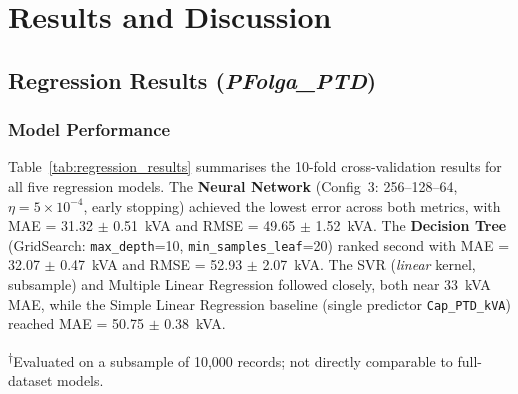 \documentclass[conference]{IEEEtran}
\begin{document}
\section{Results and Discussion}

\subsection{Regression Results (\textit{PFolga\_PTD})}

\subsubsection{Model Performance}

Table~\ref{tab:regression_results} summarises the 10-fold cross-validation results for all five regression models. The \textbf{Neural Network} (Config~3: 256--128--64, $\eta=5{\times}10^{-4}$, early stopping) achieved the lowest error across both metrics, with MAE = 31.32 $\pm$ 0.51~kVA and RMSE = 49.65 $\pm$ 1.52~kVA. The \textbf{Decision Tree} (GridSearch: \texttt{max\_depth}=10, \texttt{min\_samples\_leaf}=20) ranked second with MAE = 32.07 $\pm$ 0.47~kVA and RMSE = 52.93 $\pm$ 2.07~kVA. The SVR (\textit{linear} kernel, subsample) and Multiple Linear Regression followed closely, both near 33~kVA MAE, while the Simple Linear Regression baseline (single predictor \texttt{Cap\_PTD\_kVA}) reached MAE = 50.75 $\pm$ 0.38~kVA.

\begin{table}[htbp]
\centering
\caption{Regression Results -- 10-Fold Cross-Validation}
\small
{}
\vspace{1mm}
\footnotesize{\textsuperscript{$\dagger$}Evaluated on a subsample of 10,000 records; not directly comparable to full-dataset models.}
\label{tab:regression_results}
\end{table}
\end{document}
